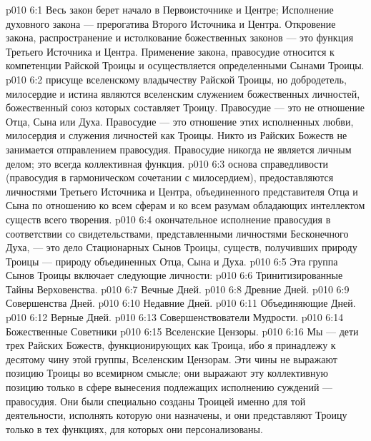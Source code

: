 \vs p010 6:1 Весь закон берет начало в Первоисточнике и Центре;  Исполнение духовного закона --- прерогатива Второго Источника и Центра. Откровение закона, распространение и истолкование божественных законов --- это функция Третьего Источника и Центра. Применение закона, правосудие относится к компетенции Райской Троицы и осуществляется определенными Сынами Троицы.
\vs p010 6:2 \pc {} присуще вселенскому владычеству Райской Троицы, но добродетель, милосердие и истина являются вселенским служением божественных личностей, божественный союз которых составляет Троицу. Правосудие --- это не отношение Отца, Сына или Духа. Правосудие --- это отношение этих исполненных любви, милосердия и служения личностей как Троицы. Никто из Райских Божеств не занимается отправлением правосудия. Правосудие никогда не является личным делом; это всегда коллективная функция.
\vs p010 6:3 \pc {} основа справедливости (правосудия в гармоническом сочетании с милосердием), предоставляются личностями Третьего Источника и Центра, объединенного представителя Отца и Сына по отношению ко всем сферам и ко всем разумам обладающих интеллектом существ всего творения.
\vs p010 6:4 \pc {} окончательное исполнение правосудия в соответствии со свидетельствами, представленными личностями Бесконечного Духа, --- это дело Стационарных Сынов Троицы, существ, получивших природу Троицы --- природу объединенных Отца, Сына и Духа.
\vs p010 6:5 \pc Эта группа Сынов Троицы включает следующие личности:
\vs p010 6:6 \bibnobreakspace Тринитизированные Тайны Верховенства.
\vs p010 6:7 \bibnobreakspace Вечные Дней.
\vs p010 6:8 \bibnobreakspace Древние Дней.
\vs p010 6:9 \bibnobreakspace Совершенства Дней.
\vs p010 6:10 \bibnobreakspace Недавние Дней.
\vs p010 6:11 \bibnobreakspace Объединяющие Дней.
\vs p010 6:12 \bibnobreakspace Верные Дней.
\vs p010 6:13 \bibnobreakspace Совершенствователи Мудрости.
\vs p010 6:14 \bibnobreakspace Божественные Советники
\vs p010 6:15 \bibnobreakspace Вселенские Цензоры.
\vs p010 6:16 \pc Мы --- дети трех Райских Божеств, функционирующих как Троица, ибо я принадлежу к десятому чину этой группы, Вселенским Цензорам. Эти чины не выражают позицию Троицы во всемирном смысле; они выражают эту коллективную позицию только в сфере вынесения подлежащих исполнению суждений --- правосудия. Они были специально созданы Троицей именно для той деятельности, исполнять которую они назначены, и они представляют Троицу только в тех функциях, для которых они персонализованы.
